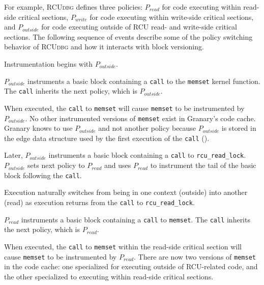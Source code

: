 \documentclass[preprint]{sigplanconf}
\newenvironment{enumerate*}%
  {\begin{enumerate}%
    \setlength{\itemsep}{2pt}%
    \setlength{\parskip}{0pt}}%
  {\end{enumerate}}
\newcommand{\toolname}[1]{{\scshape #1}}
\begin{document}
For example, \toolname{RCUdbg} defines three policies: $P_{read}$ for code executing within read-side critical sections, $P_{write}$ for code executing within write-side critical sections, and $P_{outside}$ for code executing outside of RCU read- and write-side critical sections. The following sequence of events describe some of the policy switching behavior of \toolname{RCUdbg} and how it interacts with block versioning.
\begin{enumerate*}
	\item Instrumentation begins with $P_{outside}$.
	\item $P_{outside}$ instruments a basic block containing a \texttt{call} to the \texttt{memset} kernel function. The \texttt{call} inherits the next policy, which is $P_{outside}$.
	\item When executed, the \texttt{call} to \texttt{memset} will cause \texttt{memset} to be instrumented by $P_{outside}$. No other instrumented versions of \texttt{memset} exist in Granary's code cache. Granary knows to use $P_{outside}$ and not another policy because $P_{outside}$ is stored in the edge data structure used by the first execution of the \texttt{call} ().
	\item Later, $P_{outside}$ instruments a basic block containing a \texttt{call} to \texttt{rcu\_\linebreak[0]read\_\linebreak[0]lock}. $P_{outside}$ sets next policy to $P_{read}$ and uses $P_{read}$ to instrument the tail of the basic block following the \texttt{call}.
	\item Execution naturally switches from being in one context (outside) into another (read) as execution returns from the \texttt{call} to \texttt{rcu\_\linebreak[0]read\_\linebreak[0]lock}. 
	\item $P_{read}$ instruments a basic block containing a \texttt{call} to \texttt{memset}. The \texttt{call} inherits the next policy, which is $P_{read}$.
	\item When executed, the \texttt{call} to \texttt{memset} within the read-side critical section will cause \texttt{memset} to be instrumented by $P_{read}$. There are now two versions of \texttt{memset} in the code cache: one specialized for executing outside of RCU-related code, and the other specialized to executing within read-side critical sections.
\end{enumerate*}
\end{document}
